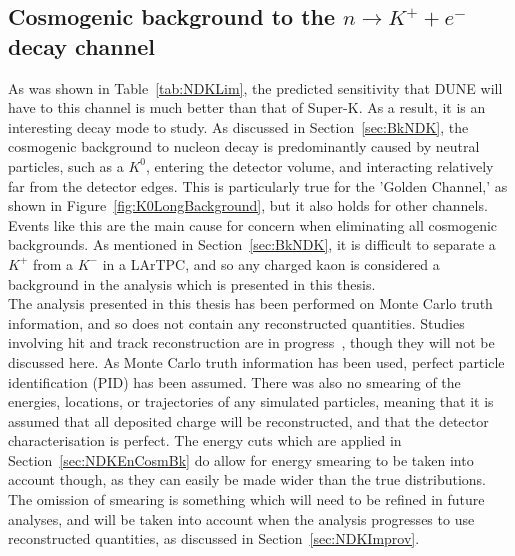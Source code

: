 \subsection{Cosmogenic background to the $n \rightarrow K^{+} + e^{-}$ decay channel} \label{sec:NDKCosmBk}
As was shown in Table~\ref{tab:NDKLim}, the predicted sensitivity that DUNE will have to this channel is much better than that of Super-K. As a result, it is an interesting decay mode to study. As discussed in Section~\ref{sec:BkNDK}, the cosmogenic background to nucleon decay is predominantly caused by neutral particles, such as a $K^0$, entering the detector volume, and interacting relatively far from the detector edges. This is particularly true for the 'Golden Channel,' as shown in Figure~\ref{fig:K0LongBackground}, but it also holds for other channels. Events like this are the main cause for concern when eliminating all cosmogenic backgrounds. As mentioned in Section~\ref{sec:BkNDK}, it is difficult to separate a $K^+$ from a $K^-$ in a LArTPC, and so any charged kaon is considered a background in the analysis which is presented in this thesis. \\

The analysis presented in this thesis has been performed on Monte Carlo truth information, and so does not contain any reconstructed quantities. Studies involving hit and track reconstruction are in progress~\citep{CosmoJanCollabMeeting}, though they will not be discussed here. As Monte Carlo truth information has been used, perfect particle identification (PID) has been assumed. There was also no smearing of the energies, locations, or trajectories of any simulated particles, meaning that it is assumed that all deposited charge will be reconstructed, and that the detector characterisation is perfect. The energy cuts which are applied in Section~\ref{sec:NDKEnCosmBk} do allow for energy smearing to be taken into account though, as they can easily be made wider than the true distributions. The omission of smearing is something which will need to be refined in future analyses, and will be taken into account when the analysis progresses to use reconstructed quantities, as discussed in Section~\ref{sec:NDKImprov}. \\ 

